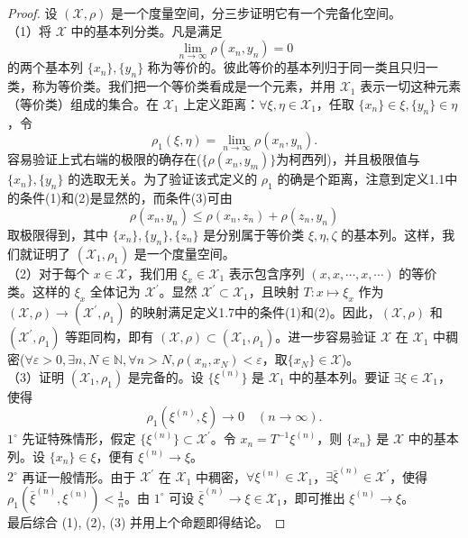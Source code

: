 \documentclass[lang=cn,newtx,10pt,scheme=chinese,thmcnt=chapter]{elegantbook}
\begin{document}
\begin{proof}
设 \( (\mathscr{X}, \rho) \) 是一个度量空间，分三步证明它有一个完备化空间。\\
（1）将 \( \mathscr{X} \) 中的基本列分类。凡是满足
\[
\lim _{n \rightarrow \infty} \rho(x_n, y_n) = 0
\]
的两个基本列 \( \{x_n\}, \{y_n\} \) 称为等价的。彼此等价的基本列归于同一类且只归一类，称为等价类。我们把一个等价类看成是一个元素，并用 \( \mathscr{X}_1 \) 表示一切这种元素（等价类）组成的集合。在 \( \mathscr{X}_1 \) 上定义距离：\( \forall \xi, \eta \in \mathscr{X}_1 \)，任取 \( \{x_n\} \in \xi, \{y_n\} \in \eta \)，令
\[
\rho_1(\xi, \eta) = \lim_{n \rightarrow \infty} \rho(x_n, y_n).
\]
容易验证上式右端的极限的确存在($\{\rho(x_n,y_m)\}$为柯西列)，并且极限值与 \( \{x_n\}, \{y_n\} \) 的选取无关。为了验证该式定义的 \( \rho_1 \) 的确是个距离，注意到定义1.1中的条件(1)和(2)是显然的，而条件(3)可由
\[
\rho(x_n, y_n) \leqslant \rho(x_n, z_n) + \rho(z_n, y_n)
\]
取极限得到，其中 \( \{x_n\}, \{y_n\}, \{z_n\} \) 是分别属于等价类 \( \xi, \eta, \zeta \) 的基本列。这样，我们就证明了 \( (\mathscr{X}_1, \rho_1) \) 是一个度量空间。\\
（2）对于每个 \( x \in \mathscr{X} \)，我们用 \( \xi_x \in \mathscr{X}_1 \) 表示包含序列 \( (x, x, \cdots, x, \cdots) \) 的等价类。这样的 \( \xi_x \) 全体记为 \( \mathscr{X}^\prime \)。显然 \( \mathscr{X}^\prime \subset \mathscr{X}_1 \)，且映射 \( T : x \mapsto \xi_x \) 作为 \( (\mathscr{X}, \rho) \rightarrow (\mathscr{X}^\prime, \rho_1) \) 的映射满足定义1.7中的条件(1)和(2)。因此，\( (\mathscr{X}, \rho) \) 和 \( (\mathscr{X}^\prime, \rho_1) \) 等距同构，即有 \( (\mathscr{X}, \rho) \subset (\mathscr{X}_1, \rho_1) \)。进一步容易验证 \( \mathscr{X} \) 在 \( \mathscr{X}_1 \) 中稠密($\forall \varepsilon>0,\exists n,N\in\mathbb{N},\forall n>N ,\rho(x_n,x_N)<\varepsilon$，取$\{x_N\}\in \mathscr{X}$)。\\
（3）证明 \( (\mathscr{X}_1, \rho_1) \) 是完备的。设 \( \{\xi^{(n)}\} \) 是 \( \mathscr{X}_1 \) 中的基本列。要证 \( \exists \xi \in \mathscr{X}_1 \)，使得
\[
\rho_1(\xi^{(n)}, \xi) \rightarrow 0 \quad (n \rightarrow \infty).
\]
\( 1^{\circ} \) 先证特殊情形，假定 \( \{\xi^{(n)}\} \subset \mathscr{X}^\prime \)。令 \( x_n = T^{-1} \xi^{(n)} \)，则 \( \{x_n\} \) 是 \( \mathscr{X} \) 中的基本列。设 \( \{x_n\} \in \xi \)，便有 \( \xi^{(n)} \rightarrow \xi \)。\\
\( 2^{\circ} \) 再证一般情形。由于 \( \mathscr{X}^\prime \) 在 \( \mathscr{X}_1 \) 中稠密，\( \forall \xi^{(n)} \in \mathscr{X}_1 \)，\( \exists \bar{\xi}^{(n)} \in \mathscr{X}^\prime \)，使得 \( \rho_1(\bar{\xi}^{(n)}, \xi^{(n)}) < \frac{1}{n} \)。由 \( 1^{\circ} \) 可设 \( \bar{\xi}^{(n)} \rightarrow \xi \in \mathscr{X}_1 \)，即可推出 \( \xi^{(n)} \rightarrow \xi \)。\\
最后综合 (1), (2), (3) 并用上个命题即得结论。
\end{proof}
\end{document}
